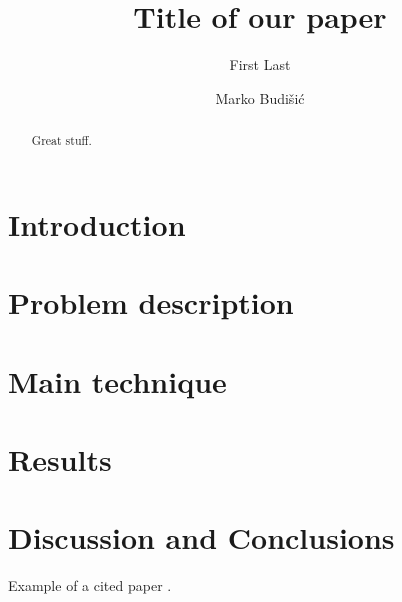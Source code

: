 \documentclass{amsart}
\begin{document}
\title{Title of our paper}

\author{First Last}
\address{Department of Mathematics, Clarkson University,
Potsdam, NY}

\author{Marko Budi\v{s}i\'c}
\address{Department of Mathematics, Clarkson University,
Potsdam, NY}

\begin{abstract}
Great stuff.
\end{abstract}

\maketitle %
\tableofcontents %


\section{Introduction}

\section{Problem description}

\section{Main technique}

\section{Results}

\section{Discussion and Conclusions}

Example of a cited paper \cite{Hill1894}.

\end{document}
